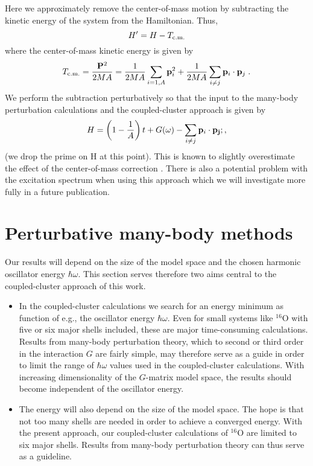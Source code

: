 \documentclass[aps,prc,twocolumn,floatfix]{revtex4}
\begin{document}
Here we approximately remove the center-of-mass motion by 
subtracting the kinetic energy of the system from the Hamiltonian. Thus, 
\begin{equation}
H'=H-T_{\rm c.m.}
\end{equation}
where the center-of-mass kinetic energy is given by
\begin{equation}
T_{\rm c.m.}=\frac{{\bf P}^2}{2MA}=\frac{1}{2MA}\sum_{i=1,A}{\bf p}_i^2
+\frac{1}{2MA}\sum_{i \ne j} {\bf p}_i\cdot{\bf p}_j\;.
\end{equation}
We perform the subtraction perturbatively so that the input to the 
many-body perturbation calculations and the coupled-cluster approach is 
given by
\begin{equation}
H=\left(1-\frac{1}{A}\right)t+G(\omega)-\sum_{i\ne j}{\bf p}_i\cdot {\bf p_j};,
\end{equation}
(we drop the prime on H at this point). 
This is known to slightly overestimate the effect of the center-of-mass 
correction \cite{kum78}. There is also a potential problem with the 
excitation spectrum when using this approach which we will investigate
more fully in a future publication. 

\section{Perturbative many-body methods}
\label{sec:mbpt}
 Our results will depend on the size of the model space and the chosen harmonic
oscillator energy $\hbar\omega$.
This section serves therefore two aims central to the coupled-cluster approach of this work.
\begin{itemize}
\item In the coupled-cluster calculations we search for an energy
minimum as function of e.g., the oscillator energy $\hbar\omega$. Even for small systems 
like  $^{16}$O with five or six 
major shells included, these are major time-consuming calculations.
Results from many-body perturbation theory, which to second or third order 
in the interaction $G$ are fairly
simple, may therefore serve as a guide in order to limit the range of $\hbar\omega$ values
used in the coupled-cluster calculations.
With increasing dimensionality of the $G$-matrix model space, the results should become
independent of the oscillator energy.
\item  The energy will also depend on the size of the model space. The hope is that not too
many shells are needed in order to achieve a converged energy. 
With the  present approach, our 
coupled-cluster calculations of  
$^{16}$O are limited to six major shells.
Results from many-body perturbation theory can thus serve as a guideline.
\end{itemize}
  
\end{document}
